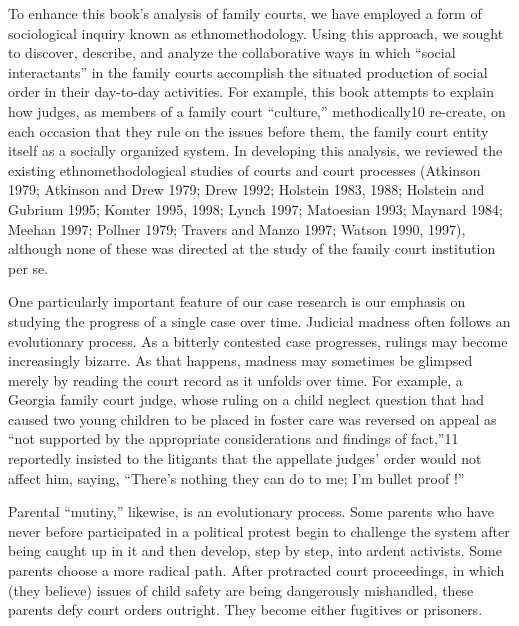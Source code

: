 To enhance this book’s analysis of family courts, we have employed a form of sociological inquiry known as ethnomethodology. Using this approach, we sought to discover, describe, and analyze the collaborative ways in which “social interactants” in the family courts accomplish the situated production of social order in their day-to-day activities. For example, this book attempts to explain how judges, as members of a family court “culture,” methodically10 re-create, on each occasion that they rule on the issues before them, the family court entity itself as a socially organized system. In developing this analysis, we reviewed the existing ethnomethodological studies of courts and court processes (Atkinson 1979; Atkinson and Drew 1979; Drew 1992; Holstein 1983, 1988; Holstein and Gubrium 1995; Komter 1995, 1998; Lynch 1997; Matoesian 1993; Maynard 1984; Meehan 1997; Pollner 1979; Travers and Manzo 1997; Watson 1990, 1997), although none of these was directed at the study of the family court institution per se. \pfl{}


One particularly important feature of our case research is our emphasis on studying the progress of a single case over time. Judicial madness often follows an evolutionary process. As a bitterly contested case progresses, rulings may become increasingly bizarre. As that happens, madness may sometimes be glimpsed merely by reading the court record as it unfolds over time. For example, a Georgia family court judge, whose ruling on a child neglect question that had caused two young children to be placed in foster care was reversed on appeal as “not supported by the appropriate considerations and findings of fact,”11 reportedly insisted to the litigants that the appellate judges’ order would not affect him, saying, “There’s nothing they can do to me; I’m bullet proof !” \pfl{}


Parental “mutiny,” likewise, is an evolutionary process. Some parents who have never before participated in a political protest begin to challenge the system after being caught up in it and then develop, step by step, into ardent activists. Some parents choose a more radical path. After protracted court proceedings, in which (they believe) issues of child safety are being dangerously mishandled, these parents defy court orders outright. They become either fugitives or prisoners. \pfl{}


